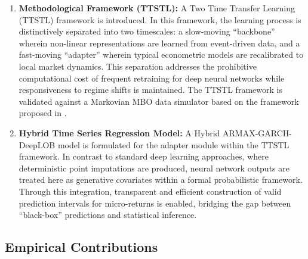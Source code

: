 \documentclass[10pt,a4paper,oneside]{article}
\begin{document}
\begin{enumerate}
    \item \textbf{Methodological Framework (TTSTL):} A Two Time Transfer Learning (TTSTL) framework is introduced. In this framework, the learning process is distinctively separated into two timescales: a slow-moving ``backbone'' wherein non-linear representations are learned from event-driven data, and a fast-moving ``adapter'' wherein typical econometric models are recalibrated to local market dynamics. This separation addresses the prohibitive computational cost of frequent retraining for deep neural networks while responsiveness to regime shifts is maintained. The TTSTL framework is validated against a Markovian MBO data simulator based on the framework proposed in \cite{cont2023mathematical}.

    \item \textbf{Hybrid Time Series Regression Model:} A Hybrid ARMAX-GARCH-DeepLOB model is formulated for the adapter module within the TTSTL framework. In contrast to standard deep learning approaches, where deterministic point imputations are produced, neural network outputs are treated here as generative covariates within a formal probabilistic framework. Through this integration, transparent and efficient construction of valid prediction intervals for micro-returns is enabled, bridging the gap between ``black-box'' predictions and statistical inference.
\end{enumerate}

\subsection{Empirical Contributions}
\end{document}
